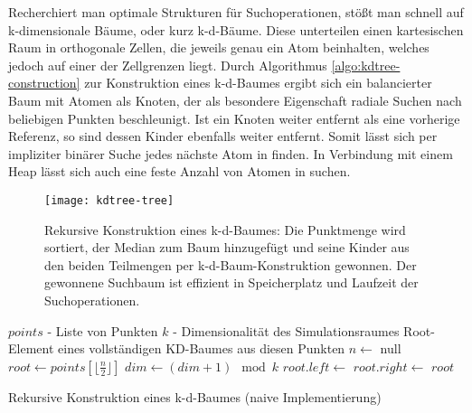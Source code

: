 Recherchiert man optimale Strukturen für Suchoperationen, stößt man schnell auf k-dimensionale Bäume, oder kurz k-d-Bäume.
Diese unterteilen einen kartesischen Raum in orthogonale Zellen, die jeweils genau ein Atom beinhalten, welches jedoch auf einer der Zellgrenzen liegt.
Durch Algorithmus \ref{algo:kdtree-construction} zur Konstruktion eines k-d-Baumes ergibt sich ein balancierter Baum mit Atomen als Knoten, der als besondere Eigenschaft radiale Suchen nach beliebigen Punkten beschleunigt.
Ist ein Knoten weiter entfernt als eine vorherige Referenz, so sind dessen Kinder ebenfalls weiter entfernt.
Somit lässt sich per impliziter binärer Suche jedes nächste Atom in  finden.
In Verbindung mit einem Heap lässt sich auch eine feste Anzahl von Atomen in  suchen.

\begin{figure}[bthp]
  \texttt{[image: kdtree-tree]}
  \caption[Konstruktion eines k-d-Baumes]{
    Rekursive Konstruktion eines k-d-Baumes: Die Punktmenge wird sortiert, der Median zum Baum hinzugefügt und seine Kinder aus den beiden Teilmengen per k-d-Baum-Konstruktion gewonnen.
    Der gewonnene Suchbaum ist effizient in Speicherplatz und Laufzeit der Suchoperationen.
}
  \label{fig:kdtree}
\end{figure}

\begin{algorithm}
  \begin{algorithmic}
    \Input $points$ - Liste von Punkten
    \Input $k$ - Dimensionalität des Simulationsraumes
    \Result Root-Element eines vollständigen KD-Baumes aus diesen Punkten
    \State
    \State $n\gets$
    \State \Return null
    \Else
    \State {} 
    \State $root\gets{}points\left[\lfloor\frac{n}{2}\rfloor\right]$
    \State $dim\gets(dim+1)\mod{k}$
    \State $root.left \gets$ 
    \State $root.right \gets$ 
    \State \Return $root$
    \EndIf
    \EndFunction
  \end{algorithmic}
  \caption[Konstruktion eines k-d-Baumes]{Rekursive Konstruktion eines k-d-Baumes (naive Implementierung)}
  \label{algo:kdtree-construction}
\end{algorithm}


